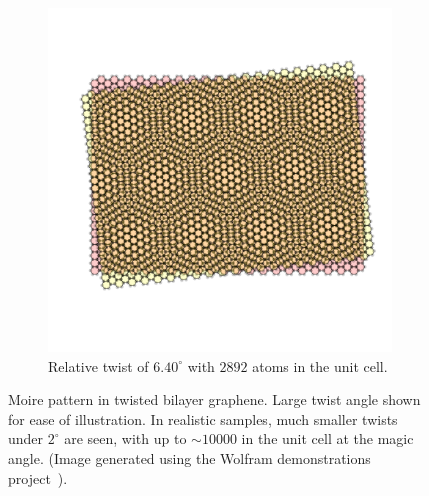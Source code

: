 \begin{figure}
\begin{subfigure}[t]{0.45\linewidth}
        \includegraphics[width=\linewidth]{figures/introduction/6_40Moire.pdf}
        \caption{\centering Relative twist of $6.40^\circ$ with $2892$ atoms in the unit cell.}
        \label{fig:twisted}
    \end{subfigure}
    \caption{Moire pattern in twisted bilayer graphene. Large twist angle shown for ease of illustration. In realistic samples, much smaller twists under $2^\circ$ are seen, with up to $\sim 10000$ in the unit cell at the magic angle. (Image generated using the Wolfram demonstrations project~\cite{MoireWolfram}).}
    \label{fig:MoirePattern}
\end{figure}

